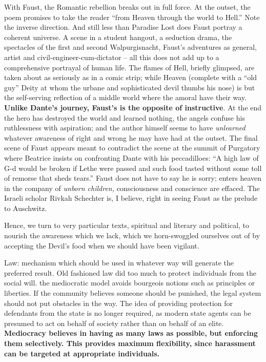 \begin{quotex}
With Faust, the Romantic rebellion breaks out in full force. At the outset, the poem promises to take the reader ``from Heaven through the world to Hell.'' Note the inverse direction. And still less than Paradise Lost does Faust portray a coherent universe. A scene in a student hangout, a seduction drama, the spectacles of the first and second Walpurgisnacht, Faust's adventures as general, artist and civil-engineer-cum-dictator -- all this does not add up to a comprehensive portrayal of human life. The flames of Hell, briefly glimpsed, are taken about as seriously as in a comic strip; while Heaven (complete with a ``old guy'' Deity at whom the urbane and sophisticated devil thumbs his nose) is but the self-serving reflection of a middle world where the amoral have their way. \textbf{Unlike Dante's journey, Faust's is the opposite of instructive}. At the end the hero has destroyed the world and learned nothing, the angels confuse his ruthlessness with aspiration; and the author himself seems to have \emph{unlearned} whatever awareness of right and wrong he may have had at the outset. The final scene of {Faust} appears meant to contradict the scene at the summit of Purgatory where Beatrice insists on confronting Dante with his peccadilloes: ``A high law of G-d would be broken if Lethe were passed and such food tasted without some toll of remorse that sheds tears.'' Faust does not have to say he is sorry; enters heaven in the company of \emph{unborn children,} consciousness and conscience are effaced. The Israeli scholar Rivkah Schechter is, I believe, right in seeing Faust as the prelude to Auschwitz.
\end{quotex}


Hence, we turn to very particular texts, spiritual and literary and political, to nourish the awareness which we lack, which we horn-swoggled ourselves out of by accepting the Devil's food when we should have been vigilant.

\begin{quotex}
Law: mechanism which should be used in whatever way will generate the preferred result. Old fashioned law did too much to protect individuals from the social will. the mediocratic model avoids bourgeois notions such as principles or liberties. If the community believes someone should be punished, the legal system should not put obstacles in the way. The idea of providing protection for defendants from the state is no longer required, as modern state agents can be presumed to act on behalf of society rather than on behalf of an elite. \textbf{Mediocracy believes in having as many laws as possible, but enforcing them selectively. This provides maximum flexibility, since harassment can be targeted at appropriate individuals.} 
\end{quotex}


